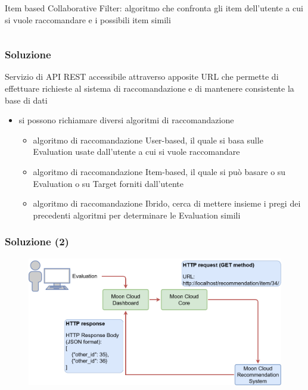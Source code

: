 \begin{frame}
\begin{columns}
\begin{column}{0.5\textwidth}
\begin{figure}
            \end{figure}
            \alert{Item based Collaborative Filter}: algoritmo che confronta gli item dell'utente a cui si vuole raccomandare e i possibili item simili 
        \end{column}
    \end{columns}
\end{frame}

\begin{frame}
    \frametitle{Soluzione}
    Servizio di \alert{API REST} accessibile attraverso apposite URL che permette di effettuare richieste al sistema di 
    raccomandazione e di mantenere consistente la base di dati
    \begin{itemize}
        \item si possono richiamare diversi algoritmi di raccomandazione
        \begin{itemize}
            \item \alert{algoritmo di raccomandazione User-based}, il quale si basa sulle Evaluation usate dall'utente a cui si vuole raccomandare 
            \item \alert{algoritmo di raccomandazione Item-based}, il quale si può basare o su Evaluation o su Target forniti dall'utente 
            \item \alert{algoritmo di raccomandazione Ibrido}, cerca di mettere insieme i pregi dei precedenti algoritmi per determinare le Evaluation simili
        \end{itemize}
    \end{itemize}
\end{frame}

\begin{frame}
    \frametitle{Soluzione (2)}
    \begin{figure}
        \centering
        \includegraphics[scale=0.32]{images/UML_MoonCloud_HowToDoPres}
    \end{figure}
\end{frame}

